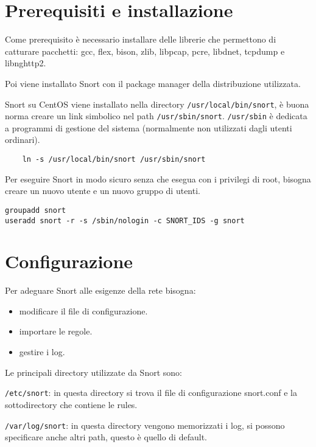 \section{Prerequisiti e installazione}

Come prerequisito è necessario installare delle librerie che permettono di catturare pacchetti: gcc, flex, bison, zlib, libpcap, pcre, libdnet, tcpdump e libnghttp2.

Poi viene installato Snort con il package manager della distribuzione utilizzata.

Snort su CentOS viene installato nella directory \texttt{/usr/local/bin/snort}, è buona norma creare un link simbolico nel path \texttt{/usr/sbin/snort}. \texttt{/usr/sbin} è dedicata a programmi di gestione del sistema (normalmente non utilizzati dagli utenti ordinari).

\begin{verbatim}
    ln -s /usr/local/bin/snort /usr/sbin/snort  
\end{verbatim}

Per eseguire Snort in modo sicuro senza che esegua con i privilegi di root, bisogna creare un nuovo utente e un nuovo gruppo di utenti.

\begin{verbatim}
groupadd snort
useradd snort -r -s /sbin/nologin -c SNORT_IDS -g snort
\end{verbatim}

\section{Configurazione}

Per adeguare Snort alle esigenze della rete bisogna:

\begin{itemize}
    \item  modificare il file di configurazione.
    \item importare le regole.
    \item gestire i log.
\end{itemize}

Le principali directory utilizzate da Snort sono:

\texttt{/etc/snort}: in questa directory si trova il file di configurazione snort.conf e la sottodirectory che contiene le rules.

\texttt{/var/log/snort}: in questa directory vengono memorizzati i log, si possono specificare anche altri path, questo è quello di default.

